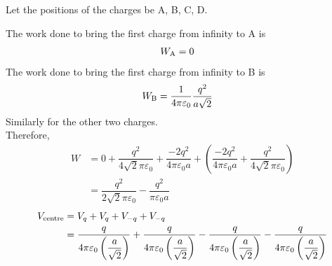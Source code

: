 \documentclass[fleqn, a4paper, 12pt, twoside]{article}
\theoremstyle{definition}
\theoremstyle{theorem}
\begin{document}
\begin{solution}
	\begin{tasks}
		\task
			Let the positions of the charges be A, B, C, D.
			\begin{figure}[H]
			\end{figure}
			The work done to bring the first charge from infinity to A is
			\begin{align*}
				W_{\textnormal{A}} &= 0
			\end{align*}
			The work done to bring the first charge from infinity to B is
			\begin{align*}
				W_{\textnormal{B}} &= \dfrac{1}{4 \pi \varepsilon_0} \dfrac{q^2}{a \sqrt{2}}
			\end{align*}
			Similarly for the other two charges.\\
			Therefore,
			\begin{align*}
				W &= 0 + \dfrac{q^2}{4 \sqrt{2} \pi \varepsilon_0} + \dfrac{-2q^2}{4 \pi \varepsilon_0 a} + \left( \dfrac{-2q^2}{4 \pi \varepsilon_0 a} + \dfrac{q^2}{4 \sqrt{2} \pi \varepsilon_0} \right)\\
				&= \dfrac{q^2}{2 \sqrt{2} \pi \varepsilon_0} - \dfrac{q^2}{\pi \varepsilon_0 a}
			\end{align*}
		\task
			\begin{align*}
				V_{\textnormal{centre}} &= V_{q} + V_{q} + V_{-q} + V_{-q}\\
				&= \dfrac{q}{4 \pi \varepsilon_0 \left( \dfrac{a}{\sqrt{2}} \right)} + \dfrac{q}{4 \pi \varepsilon_0 \left( \dfrac{a}{\sqrt{2}} \right)} - \dfrac{q}{4 \pi \varepsilon_0 \left( \dfrac{a}{\sqrt{2}} \right)} - \dfrac{q}{4 \pi \varepsilon_0 \left( \dfrac{a}{\sqrt{2}} \right)}\\

\end{align*}
\end{tasks}
\end{solution}
\end{document}
